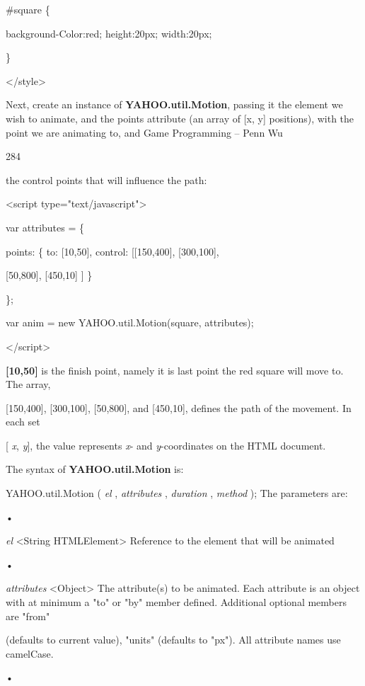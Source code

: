 \documentclass[
]{article}
\begin{document}
\#square \{

background-Color:red; height:20px; width:20px;

\}

\textless/style\textgreater{}

Next, create an instance of \textbf{YAHOO.util.Motion}, passing it the
element we wish to animate, and the points attribute (an array of {[}x,
y{]} positions), with the point we are animating to, and Game
Programming -- Penn Wu

284

\protect\hypertarget{index_split_015.htmlux5cux23p285}{}{}the control
points that will influence the path:

\textless script type="text/javascript"\textgreater{}

var attributes = \{

points: \{ to: {[}10,50{]}, control: {[}{[}150,400{]}, {[}300,100{]},

{[}50,800{]}, {[}450,10{]} {]} \}

\};

var anim = new
YAHOO.util.Motion(\textquotesingle square\textquotesingle, attributes);

\textless/script\textgreater{}

\textbf{{[}10,50{]}} is the finish point, namely it is last point the
red square will move to. The array,

{[}150,400{]}, {[}300,100{]}, {[}50,800{]}, and {[}450,10{]}, defines
the path of the movement. In each set

{[} \emph{x}, \emph{y}{]}, the value represents \emph{x}- and
\emph{y}-coordinates on the HTML document.

The syntax of \textbf{YAHOO.util.Motion} is:

YAHOO.util.Motion ( \emph{el} , \emph{attributes} , \emph{duration} ,
\emph{method} ); The parameters are:

•

\emph{el} \textless String \textbar{} HTMLElement\textgreater{}
Reference to the element that will be animated

•

\emph{attributes} \textless Object\textgreater{} The attribute(s) to be
animated. Each attribute is an object with at minimum a "to" or "by"
member defined. Additional optional members are "from"

(defaults to current value), "units" (defaults to "px"). All attribute
names use camelCase.

•
\end{document}
